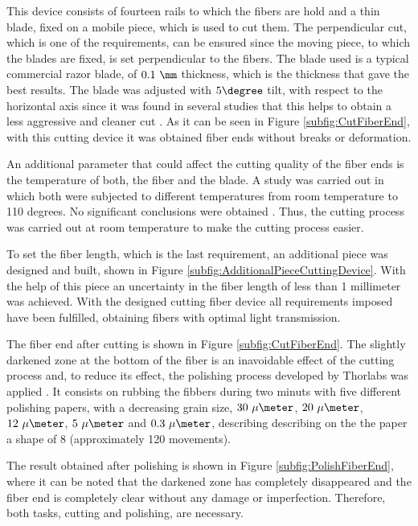 This device consists of fourteen rails to which the fibers are hold and a thin blade, fixed on a mobile piece, which is used to cut them. The perpendicular cut, which is one of the requirements, can be ensured since the moving piece, to which the blades are fixed, is set perpendicular to the fibers. The blade used is a typical commercial razor blade, of $0.1~\mm$ thickness, which is the thickness that gave the best results. The blade was adjusted with $5\degree$ tilt, with respect to the horizontal axis since it was found in several studies that this helps to obtain a less aggressive and cleaner cut \cite{AngleBlade, TemperatureBlade}. As it can be seen in Figure \ref{subfig:CutFiberEnd}, with this cutting device it was obtained fiber ends without breaks or deformation.

An additional parameter that could affect the cutting quality of the fiber ends is the temperature of both, the fiber and the blade. A study was carried out in which both were subjected to different temperatures from room temperature to 110 degrees. No significant conclusions were obtained \cite{TFGAlberto}. Thus, the cutting process was carried out at room temperature to make the cutting process easier.

To set the fiber length, which is the last requirement, an additional piece was designed and built, shown in Figure \ref{subfig:AdditionalPieceCuttingDevice}. With the help of this piece an uncertainty in the fiber length of less than 1 millimeter was achieved. With the designed cutting fiber device all requirements imposed have been fulfilled, obtaining fibers with optimal light transmission.

The fiber end after cutting is shown in Figure \ref{subfig:CutFiberEnd}. The slightly darkened zone at the bottom of the fiber is an inavoidable effect of the cutting process and, to reduce its effect, the polishing process developed by Thorlabs was applied \cite{DiamondThorlabs}. It consists on rubbing the fibbers during two minuts with five different polishing papers, with a decreasing grain size, $30~\mu\meter$, $20~\mu\meter$, $12~\mu\meter$, $5~\mu\meter$ and $0.3~\mu\meter$, describing describing on the the paper a shape of 8 (approximately 120 movements). 

The result obtained after polishing is shown in Figure \ref{subfig:PolishFiberEnd}, where it can be noted that the darkened zone has completely disappeared and the fiber end is completely clear without any damage or imperfection. Therefore, both tasks, cutting and polishing,  are necessary.

